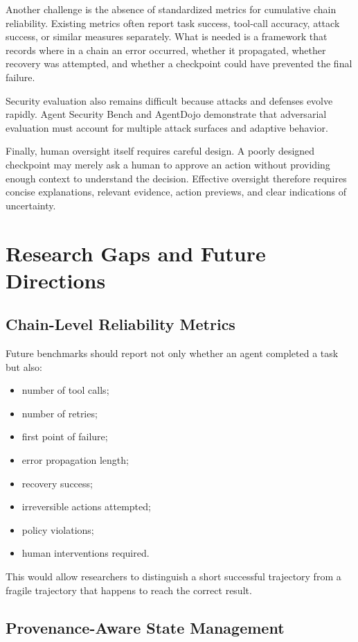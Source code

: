 \documentclass[11pt]{article}
\begin{document}
Another challenge is the absence of standardized metrics
for cumulative chain reliability. Existing metrics often
report task success, tool-call accuracy, attack success, or
similar measures separately. What is needed is a
framework that records where in a chain an error occurred,
whether it propagated, whether recovery was attempted,
and whether a checkpoint could have prevented the final
failure.

Security evaluation also remains difficult because attacks
and defenses evolve rapidly. Agent Security Bench and
AgentDojo demonstrate that adversarial evaluation must
account for multiple attack surfaces and adaptive behavior.

Finally, human oversight itself requires careful design. A poorly
designed checkpoint may merely ask a human to approve an
action without providing enough context to understand the
decision. Effective oversight therefore requires concise
explanations, relevant evidence, action previews, and clear
indications of uncertainty.

\section{Research Gaps and Future Directions}

\subsection{Chain-Level Reliability Metrics}

Future benchmarks should report not only whether an agent completed a task but also:
\begin{itemize}[noitemsep]
    \item number of tool calls;
    \item number of retries;
    \item first point of failure;
    \item error propagation length;
    \item recovery success;
    \item irreversible actions attempted;
    \item policy violations;
    \item human interventions required.
\end{itemize}

This would allow researchers to distinguish a short successful trajectory from a
fragile trajectory that happens to reach the correct result.

\subsection{Provenance-Aware State Management}
\end{document}
